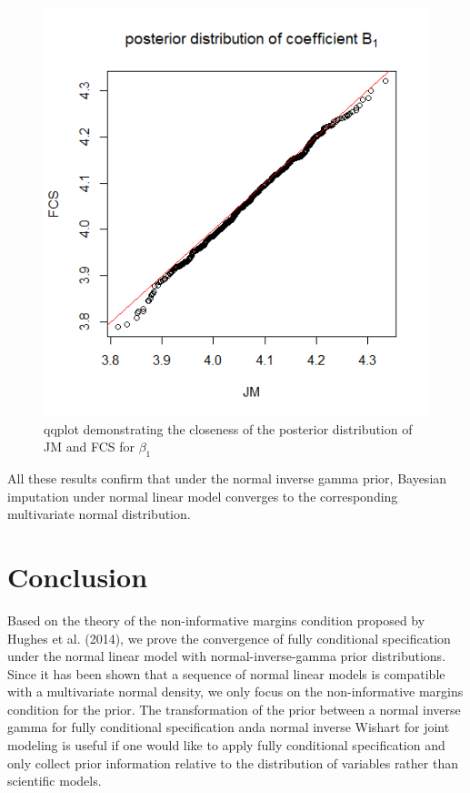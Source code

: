 \documentclass[12pt, fullpage, a4paper]{article}
\begin{document}
\begin{figure}[h]
	\centering
	\includegraphics[scale=0.7]{plot/200708}
	\caption{qqplot demonstrating the closeness of the posterior distribution of JM and FCS for $\beta_{1}$}
	\label{fig1}
\end{figure} 

All these results confirm that under the normal inverse gamma prior, Bayesian imputation under normal linear model converges to the corresponding multivariate normal distribution. 

\section{Conclusion}
Based on the theory of the non-informative margins condition proposed by Hughes et al. (2014), we prove the convergence of fully conditional specification under the normal linear model with normal-inverse-gamma prior distributions. Since it has been shown that a sequence of normal linear models is compatible with a multivariate normal density, we only focus on the non-informative margins condition for the prior. The transformation of the prior between a normal inverse gamma for fully conditional specification anda normal inverse Wishart for joint modeling is useful if one would like to apply fully conditional specification and only collect prior information relative to the distribution of variables rather than scientific models. 
\end{document}
